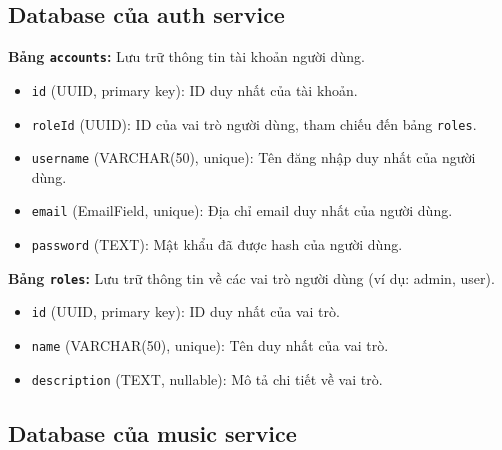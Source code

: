 \subsection{Database của auth service}
\label{subsec:db_auth_service}

\textbf{Bảng \texttt{accounts}:} Lưu trữ thông tin tài khoản người dùng.
\begin{itemize}
    \item \texttt{id} (UUID, primary key): ID duy nhất của tài khoản.
    \item \texttt{roleId} (UUID): ID của vai trò người dùng, tham chiếu đến bảng \texttt{roles}.
    \item \texttt{username} (VARCHAR(50), unique): Tên đăng nhập duy nhất của người dùng.
    \item \texttt{email} (EmailField, unique): Địa chỉ email duy nhất của người dùng.
    \item \texttt{password} (TEXT): Mật khẩu đã được hash của người dùng.
\end{itemize}
\textbf{Bảng \texttt{roles}:} Lưu trữ thông tin về các vai trò người dùng (ví dụ: admin, user).
\begin{itemize}
    \item \texttt{id} (UUID, primary key): ID duy nhất của vai trò.
    \item \texttt{name} (VARCHAR(50), unique): Tên duy nhất của vai trò.
    \item \texttt{description} (TEXT, nullable): Mô tả chi tiết về vai trò.
\end{itemize}

\subsection{Database của music service}
\label{subsec:db_music_service}

